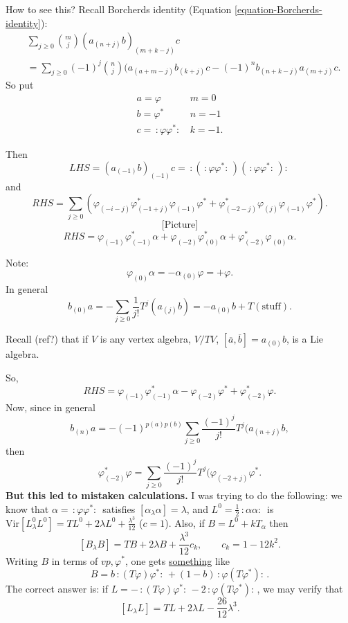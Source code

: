 How to see this?
Recall Borcherds identity (Equation \ref{equation-Borcherds-identity}):
\begin{align*}
&\sum_{j \geq 0}\binom{m}{j}(a_{(n+j)}b)_{(m+k-j)}c\\
&=\sum_{j \geq 0}(-1)^j \binom{n}{j}
(a_{(a+m-j)}b_{(k+j)}c-(-1)^nb_{(n+k-j)}a_{(m+j)}c.
\end{align*}
So put
$$
\begin{matrix}
a=\varphi & m=0\\
b=\varphi^*  & n=-1\\
c=\,:\!\varphi \varphi ^*\!:\,& k=-1.
\end{matrix}
$$

Then
$$
LHS=(a_{(-1)}b)_{(-1)}c=\,:\!(\,:\!\varphi\varphi^*\!:\,)
(\,:\!\varphi\varphi^*\!:\,)\!:\,
$$
and
$$
RHS=\sum_{j \geq 0}(\varphi_{(-i-j)}\varphi^*_{(-1+j)}\varphi_{(-1)}\varphi^*
+\varphi^*_{(-2-j)}\varphi_{(j)}\varphi_{(-1)}\varphi^*).
$$
$$
\text{[Picture]}
$$
$$
RHS=\varphi_{(-1)}\varphi^*_{(-1)}\alpha+\varphi_{(-2)}\varphi^*_{(0)}\alpha
+\varphi^*_{(-2)}\varphi_{(0)}\alpha.
$$

Note:
$$
\varphi_{(0)}\alpha=-\alpha_{(0)}\varphi=+\varphi.
$$
In general
$$
b_{(0)}a=-\sum_{j\geq 0}\frac{1}{j!}T^j(a_{(j)}b)
=-a_{(0)}b+T(\text{stuff}).
$$

\begin{remark}
\label{remark-quotient}
Recall (ref?) that if $V$ is any vertex algebra,
$V/TV$, $[\overline{a},\overline{b}]=a_{(0)}b$,
is a Lie algebra.
\end{remark}

\noindent
So,
$$
RHS=\varphi_{(-1)}\varphi^*_{(-1)}\alpha
-\varphi_{(-2)}\varphi^*+\varphi^*_{(-2)}\varphi.
$$
Now, since in general
$$
b_{(n)}a=-(-1)^{p(a)p(b)}\sum_{j \geq 0}\frac{(-1)^j}{j!}
T^j(a_{(n+j)}b,
$$
then
$$
\varphi^*_{(-2)}\varphi=\sum_{j\geq 0}\frac{(-1)^j}{j!}
T^j(\varphi_{(-2+j)}\varphi^*.
$$
{\bf But this led to mistaken calculations.}
I was trying to do the following: we know that
$\alpha=\,:\!\varphi \varphi^*\!:\,$ satisfies
$[\alpha_\lambda \alpha]=\lambda$,
and $L^0=\frac{1}{2}\,:\!\alpha \alpha\!:\,$ is
$\text{Vir}[L^0_\lambda L^0]=TL^0+2\lambda L^0+\frac{\lambda^3}{12}$
($c=1$).
Also, if $B=L^0+kT_\alpha$ then
$$
[B_\lambda B]=TB+2\lambda B+\frac{\lambda^3}{12}c_k,\qquad 
c_k=1-12k^2.
$$
Writing $B$ in terms of $vp,\varphi^*$,
one gets \underline{something} like
$$
B=b\,:\!(T\varphi)\varphi^*\!:\,
+(1-b)\,:\!\varphi(T\varphi^*)\!:\,.
$$
The correct answer is: if 
$L=-\,:\!(T\varphi)\varphi^*\!:\,-2\,:\!\varphi(T\varphi^*)\!:\,$,
we may verify that
$$
[L_\lambda L]=TL+2\lambda L- \frac{26}{12}\lambda^3.
$$


